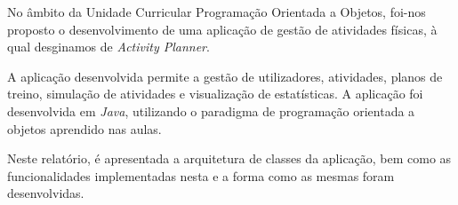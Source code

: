 \documentclass[a4paper,12pt]{scrreprt}
\begin{document}



\makecover



\renewenvironment{abstract}
 {\par\noindent\textbf{\Large\abstractname}\par\bigskip}
 {}

\begin{flushleft}
\begin{abstract}
    No âmbito da Unidade Curricular Programação Orientada a Objetos, foi-nos proposto o
    desenvolvimento de uma aplicação de gestão de atividades físicas, à qual desginamos de \textit{Activity Planner}.

    A aplicação desenvolvida permite a gestão de utilizadores, atividades, planos de treino, simulação de atividades e
    visualização de estatísticas. A aplicação foi desenvolvida em \textit{Java}, utilizando o paradigma de programação
    orientada a objetos aprendido nas aulas.

    Neste relatório, é apresentada a arquitetura de classes da aplicação, bem
    como as funcionalidades implementadas nesta e a forma como as mesmas foram desenvolvidas.
\end{abstract}
\end{flushleft}



\renewcommand{\contentsname}{Índice}
\end{document}
